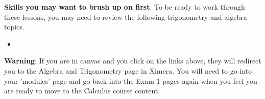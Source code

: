 \documentclass{ximera}
\begin{document}
\bigskip

\textbf{Skills you may want to brush up on first}: To be ready to work
through these lessons, you may need to review the following trigonometry and algebra topics.
\begin{itemize}
    \item {}%
\end{itemize}

\bigskip

\textbf{Warning}: If you are in canvas and you click on the links above, they will redirect you
to the Algebra and Trigonometry page in Ximera. You will need to
go into your 'modules' page and go back into the Exam 1 pages again
when you feel you are ready to move to the Calculus course content.
\end{document}
